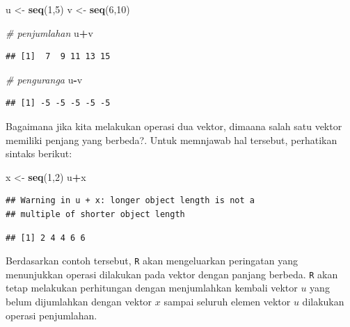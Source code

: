 \documentclass[
]{book}
\newenvironment{Shaded}{\begin{snugshade}}{\end{snugshade}}
\newcommand{\CommentTok}[1]{\textcolor[rgb]{0.56,0.35,0.01}{\textit{#1}}}
\newcommand{\DecValTok}[1]{\textcolor[rgb]{0.00,0.00,0.81}{#1}}
\newcommand{\FunctionTok}[1]{\textcolor[rgb]{0.13,0.29,0.53}{\textbf{#1}}}
\newcommand{\NormalTok}[1]{#1}
\newcommand{\OtherTok}[1]{\textcolor[rgb]{0.56,0.35,0.01}{#1}}
\newcommand{\SpecialCharTok}[1]{\textcolor[rgb]{0.81,0.36,0.00}{\textbf{#1}}}
\theoremstyle{definition}
\theoremstyle{definition}
\theoremstyle{definition}
\theoremstyle{definition}
\theoremstyle{remark}
\begin{document}
\begin{Shaded}
\begin{Highlighting}[]
\NormalTok{u }\OtherTok{\textless{}{-}} \FunctionTok{seq}\NormalTok{(}\DecValTok{1}\NormalTok{,}\DecValTok{5}\NormalTok{)}
\NormalTok{v }\OtherTok{\textless{}{-}} \FunctionTok{seq}\NormalTok{(}\DecValTok{6}\NormalTok{,}\DecValTok{10}\NormalTok{)}

\CommentTok{\# penjumlahan}
\NormalTok{u}\SpecialCharTok{+}\NormalTok{v}
\end{Highlighting}
\end{Shaded}

\begin{verbatim}
## [1]  7  9 11 13 15
\end{verbatim}

\begin{Shaded}
\begin{Highlighting}[]
\CommentTok{\# penguranga}
\NormalTok{u}\SpecialCharTok{{-}}\NormalTok{v}
\end{Highlighting}
\end{Shaded}

\begin{verbatim}
## [1] -5 -5 -5 -5 -5
\end{verbatim}

Bagaimana jika kita melakukan operasi dua vektor, dimaana salah satu vektor memiliki penjang yang berbeda?. Untuk memnjawab hal tersebut, perhatikan sintaks berikut:

\begin{Shaded}
\begin{Highlighting}[]
\NormalTok{x }\OtherTok{\textless{}{-}} \FunctionTok{seq}\NormalTok{(}\DecValTok{1}\NormalTok{,}\DecValTok{2}\NormalTok{)}
\NormalTok{u}\SpecialCharTok{+}\NormalTok{x}
\end{Highlighting}
\end{Shaded}

\begin{verbatim}
## Warning in u + x: longer object length is not a
## multiple of shorter object length
\end{verbatim}

\begin{verbatim}
## [1] 2 4 4 6 6
\end{verbatim}

Berdasarkan contoh tersebut, \texttt{R} akan mengeluarkan peringatan yang menunjukkan operasi dilakukan pada vektor dengan panjang berbeda. \texttt{R} akan tetap melakukan perhitungan dengan menjumlahkan kembali vektor \(u\) yang belum dijumlahkan dengan vektor \(x\) sampai seluruh elemen vektor \(u\) dilakukan operasi penjumlahan.
\end{document}
